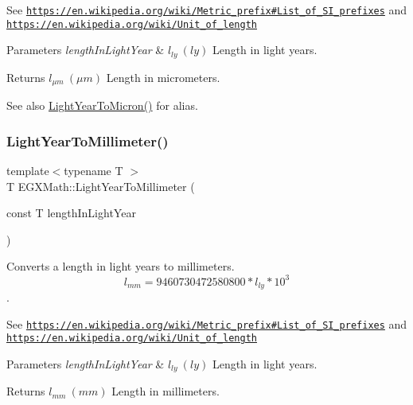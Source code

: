 See \href{https://en.wikipedia.org/wiki/Metric_prefix#List_of_SI_prefixes}{\tt https\+://en.\+wikipedia.\+org/wiki/\+Metric\+\_\+prefix\#\+List\+\_\+of\+\_\+\+S\+I\+\_\+prefixes} and \href{https://en.wikipedia.org/wiki/Unit_of_length}{\tt https\+://en.\+wikipedia.\+org/wiki/\+Unit\+\_\+of\+\_\+length} 
\begin{DoxyParams}{Parameters}
{\em length\+In\+Light\+Year} & $ l_{ly}\ (ly)$ Length in light years. \\
\hline
\end{DoxyParams}
\begin{DoxyReturn}{Returns}
$ l_{\mu m}\ (\mu m)$ Length in micrometers. 
\end{DoxyReturn}
\begin{DoxySeeAlso}{See also}
\mbox{\hyperlink{group___e_g_x_math-_conversions-_length_conversions-_astronomical-_light_year-_non-_s_i_gaa1be4e14f5ac7b272f28ce3e115b61c7}{Light\+Year\+To\+Micron()}} for alias. 
\end{DoxySeeAlso}
\mbox{\label{group___e_g_x_math-_conversions-_length_conversions-_astronomical-_light_year-_s_i_ga667fa52ea9719ece8243c50376499c78}} 
\subsubsection{\texorpdfstring{Light\+Year\+To\+Millimeter()}{LightYearToMillimeter()}}
{\footnotesize\ttfamily template$<$typename T $>$ \\
T E\+G\+X\+Math\+::\+Light\+Year\+To\+Millimeter (\begin{DoxyParamCaption}\item[{const T}]{length\+In\+Light\+Year }\end{DoxyParamCaption})}



Converts a length in light years to millimeters. \[ l_{mm}=9460730472580800 * l_{ly} * 10^{3} \]. 

See \href{https://en.wikipedia.org/wiki/Metric_prefix#List_of_SI_prefixes}{\tt https\+://en.\+wikipedia.\+org/wiki/\+Metric\+\_\+prefix\#\+List\+\_\+of\+\_\+\+S\+I\+\_\+prefixes} and \href{https://en.wikipedia.org/wiki/Unit_of_length}{\tt https\+://en.\+wikipedia.\+org/wiki/\+Unit\+\_\+of\+\_\+length} 
\begin{DoxyParams}{Parameters}
{\em length\+In\+Light\+Year} & $ l_{ly}\ (ly)$ Length in light years. \\
\hline
\end{DoxyParams}
\begin{DoxyReturn}{Returns}
$ l_{mm}\ (mm)$ Length in millimeters. 
\end{DoxyReturn}
\mbox{\label{group___e_g_x_math-_conversions-_length_conversions-_astronomical-_light_year-_s_i_ga1e2666960159c36972f39a0630389b4e}} 
